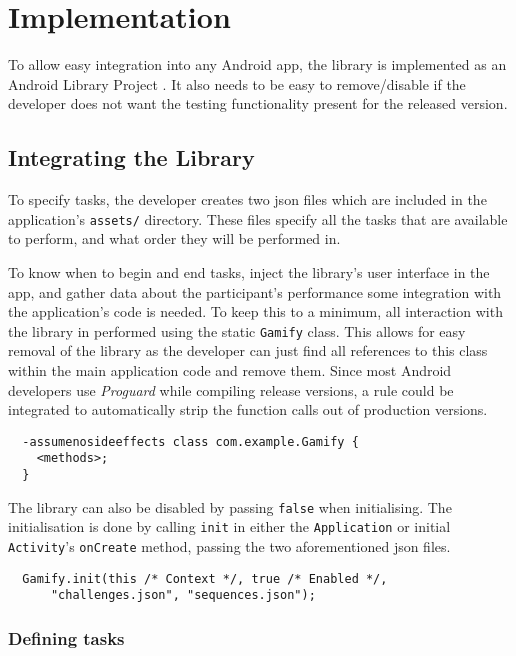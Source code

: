 \chapter{Implementation}

To allow easy integration into any Android app, the library is implemented
as an Android Library Project \cite{android-library}.  It also needs to be easy
to remove/disable if the developer does not want the testing functionality
present for the released version.

\section{Integrating the Library}

To specify tasks, the developer creates two json files which are
included in the application's \verb+assets/+ directory. These files specify all the tasks that are available to perform, and what order they will be performed in.

To know when to begin and end tasks, inject the library's user interface in the app, and gather data about the participant's performance some integration with the application's code is needed.
To keep this to a minimum, all interaction with
the library in performed using the static \verb/Gamify/ class. This allows for
easy removal of the library as the developer can just find all references to
this class within the main application code and remove them. Since most Android
developers use \emph{Proguard} while compiling release versions, a rule could be
integrated to automatically strip the function calls out of production versions.

\begin{verbatim}
  -assumenosideeffects class com.example.Gamify {
    <methods>;
  }
\end{verbatim}

The library can also be disabled by passing \verb|false| when initialising. The
initialisation is done by calling \verb|init| in either the \verb|Application|
or initial \verb|Activity|'s \verb|onCreate| method, passing the two
aforementioned json files.

\begin{verbatim}
  Gamify.init(this /* Context */, true /* Enabled */,
      "challenges.json", "sequences.json");
\end{verbatim}

\subsection{Defining tasks}

